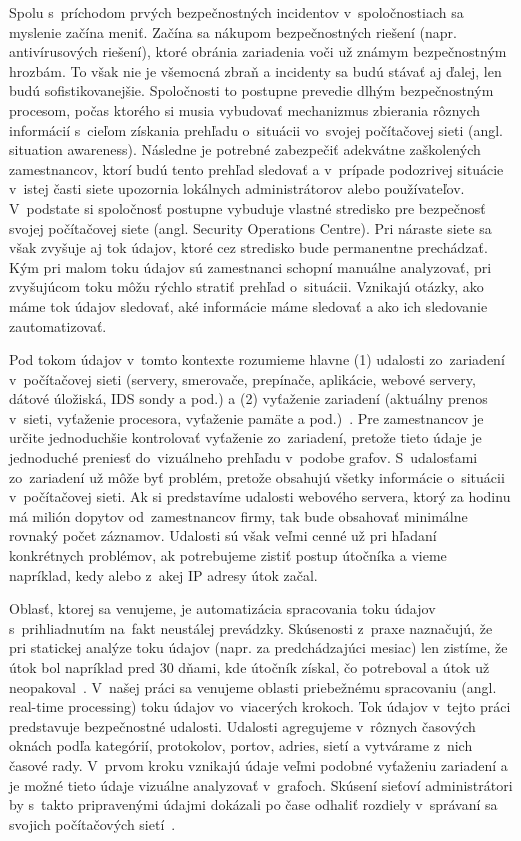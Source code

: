 \documentclass[thesismargins, thesislinespacing, openright, upjsfrontpage]{rnthesis}
\begin{document}
Spolu s~príchodom prvých bezpečnostných incidentov v~spoločnostiach sa myslenie začína meniť. Začína sa nákupom bezpečnostných riešení (napr. antivírusových riešení), ktoré obránia zariadenia voči už známym bezpečnostným hrozbám. To však nie je všemocná zbraň a incidenty sa budú stávať aj ďalej, len budú sofistikovanejšie. Spoločnosti to postupne prevedie dlhým bezpečnostným procesom, počas ktorého si musia vybudovať mechanizmus zbierania rôznych informácií s~cieľom získania prehľadu o~situácii vo~svojej počítačovej sieti (angl. situation awareness). Následne je potrebné zabezpečiť adekvátne zaškolených zamestnancov, ktorí budú tento prehľad sledovať a v~prípade podozrivej situácie v~istej časti siete upozornia lokálnych administrátorov alebo používateľov. V~podstate si spoločnosť postupne vybuduje vlastné stredisko pre bezpečnosť svojej počítačovej siete (angl. Security Operations Centre). Pri náraste siete sa však zvyšuje aj tok údajov, ktoré cez stredisko bude permanentne prechádzať. Kým pri malom toku údajov sú zamestnanci schopní manuálne analyzovať, pri zvyšujúcom toku môžu rýchlo stratiť prehľad o~situácii. Vznikajú otázky, ako máme tok údajov sledovať, aké informácie máme sledovať a ako ich sledovanie zautomatizovať.

Pod tokom údajov v~tomto kontexte rozumieme hlavne (1) udalosti zo~zariadení v~počítačovej sieti (servery, smerovače, prepínače, aplikácie, webové servery, dátové úložiská, IDS sondy a pod.) a (2) vyťaženie zariadení (aktuálny prenos v~sieti, vyťaženie procesora, vyťaženie pamäte a pod.)~\cite{kent2016cyber}. Pre zamestnancov je určite jednoduchšie kontrolovať vyťaženie zo~zariadení, pretože tieto údaje je jednoduché preniesť do~vizuálneho prehľadu v~podobe grafov. S~udalosťami zo~zariadení už môže byť problém, pretože obsahujú všetky informácie o~situácii v~počítačovej sieti. Ak si predstavíme udalosti webového servera, ktorý za hodinu má milión dopytov od~zamestnancov firmy, tak bude obsahovať minimálne rovnaký počet záznamov. Udalosti sú však veľmi cenné už pri hľadaní konkrétnych problémov, ak potrebujeme zistiť postup útočníka a vieme napríklad, kedy alebo z~akej IP adresy útok začal. 

Oblasť, ktorej sa venujeme, je automatizácia spracovania toku údajov s~prihliadnutím na~fakt neustálej prevádzky. Skúsenosti z~praxe naznačujú, že pri statickej analýze toku údajov (napr. za predchádzajúci mesiac) len zistíme, že útok bol napríklad pred 30 dňami, kde útočník získal, čo potreboval a útok už neopakoval~\cite{park2010study}. V~našej práci sa venujeme oblasti priebežnému spracovaniu (angl. real-time processing) toku údajov vo~viacerých krokoch. Tok údajov v~tejto práci predstavuje bezpečnostné udalosti. Udalosti agregujeme v~rôznych časových oknách podľa kategórií, protokolov, portov, adries, sietí a vytvárame z~nich časové rady. V~prvom kroku vznikajú údaje veľmi podobné vyťaženiu zariadení a je možné tieto údaje vizuálne analyzovať v~grafoch. Skúsení sieťoví administrátori by s~takto pripravenými údajmi dokázali po čase odhaliť rozdiely v~správaní sa svojich počítačových sietí~\cite{papagiannaki2005long}.
\end{document}

